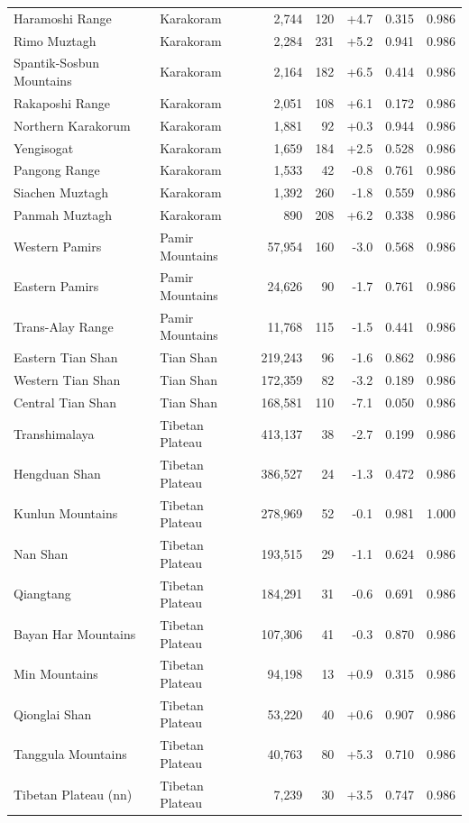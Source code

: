 \begin{tabular}{llrrrrr}
Haramoshi Range & Karakoram & 2{,}744 & 120 & +4.7 & 0.315 & 0.986 \\
Rimo Muztagh & Karakoram & 2{,}284 & 231 & +5.2 & 0.941 & 0.986 \\
Spantik-Sosbun Mountains & Karakoram & 2{,}164 & 182 & +6.5 & 0.414 & 0.986 \\
Rakaposhi Range & Karakoram & 2{,}051 & 108 & +6.1 & 0.172 & 0.986 \\
Northern Karakorum & Karakoram & 1{,}881 & 92 & +0.3 & 0.944 & 0.986 \\
Yengisogat & Karakoram & 1{,}659 & 184 & +2.5 & 0.528 & 0.986 \\
Pangong Range & Karakoram & 1{,}533 & 42 & -0.8 & 0.761 & 0.986 \\
Siachen Muztagh & Karakoram & 1{,}392 & 260 & -1.8 & 0.559 & 0.986 \\
Panmah Muztagh & Karakoram & 890 & 208 & +6.2 & 0.338 & 0.986 \\
Western Pamirs & Pamir Mountains & 57{,}954 & 160 & -3.0 & 0.568 & 0.986 \\
Eastern Pamirs & Pamir Mountains & 24{,}626 & 90 & -1.7 & 0.761 & 0.986 \\
Trans-Alay Range & Pamir Mountains & 11{,}768 & 115 & -1.5 & 0.441 & 0.986 \\
Eastern Tian Shan & Tian Shan & 219{,}243 & 96 & -1.6 & 0.862 & 0.986 \\
Western Tian Shan & Tian Shan & 172{,}359 & 82 & -3.2 & 0.189 & 0.986 \\
Central Tian Shan & Tian Shan & 168{,}581 & 110 & -7.1 & 0.050 & 0.986 \\
Transhimalaya & Tibetan Plateau & 413{,}137 & 38 & -2.7 & 0.199 & 0.986 \\
Hengduan Shan & Tibetan Plateau & 386{,}527 & 24 & -1.3 & 0.472 & 0.986 \\
Kunlun Mountains & Tibetan Plateau & 278{,}969 & 52 & -0.1 & 0.981 & 1.000 \\
Nan Shan & Tibetan Plateau & 193{,}515 & 29 & -1.1 & 0.624 & 0.986 \\
Qiangtang & Tibetan Plateau & 184{,}291 & 31 & -0.6 & 0.691 & 0.986 \\
Bayan Har Mountains & Tibetan Plateau & 107{,}306 & 41 & -0.3 & 0.870 & 0.986 \\
Min Mountains & Tibetan Plateau & 94{,}198 & 13 & +0.9 & 0.315 & 0.986 \\
Qionglai Shan & Tibetan Plateau & 53{,}220 & 40 & +0.6 & 0.907 & 0.986 \\
Tanggula Mountains & Tibetan Plateau & 40{,}763 & 80 & +5.3 & 0.710 & 0.986 \\
Tibetan Plateau (nn) & Tibetan Plateau & 7{,}239 & 30 & +3.5 & 0.747 & 0.986 \\
\bottomrule
\end{tabular}

